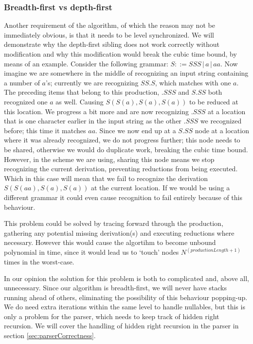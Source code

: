 \documentclass[a4paper,10pt]{article}
\begin{document}
\subsubsection{Breadth-first vs depth-first}
Another requirement of the algorithm, of which the reason may not be immediately obvious, is that it needs to be level synchronized. We will demonstrate why the depth-first sibling does not work correctly without modification and why this modification would break the cubic time bound, by means of an example. Consider the following grammar: $S ::= SSS\,|\,a\,|\,aa$. Now imagine we are somewhere in the middle of recognizing an input string containing a number of $a$'s; currently we are recognizing $SS.S$, which matches with one $a$. The preceding items that belong to this production, $.SSS$ and $S.SS$ both recognized one $a$ as well. Causing $S(S(a),S(a),S(a))$ to be reduced at this location. We progress a bit more and are now recognizing $.SSS$ at a location that is one character earlier in the input string as the other $.SSS$ we recognized before; this time it matches $aa$. Since we now end up at a $S.SS$ node at a location where it was already recognized, we do not progress further; this node needs to be shared, otherwise we would do duplicate work, breaking the cubic time bound. However, in the scheme we are using, sharing this node means we stop recognizing the current derivation, preventing reductions from being executed. Which in this case will mean that we fail to recognize the derivation $S(S(aa),S(a),S(a))$ at the current location. If we would be using a different grammar it could even cause recognition to fail entirely because of this behaviour.

This problem could be solved by tracing forward through the production, gathering any potential missing derivation(s) and executing reductions where necessary. However this would cause the algortihm to become unbound polynomial in time, since it would lead us to `touch' nodes $N^{(productionLength+1)}$ times in the worst-case.

In our opinion the solution for this problem is both to complicated and, above all, unnecessary. Since our algorithm is breadth-first, we will never have stacks running ahead of others, eliminating the possibility of this behaviour popping-up. We do need extra iterations within the same level to handle nullables, but this is only a problem for the parser, which needs to keep track of hidden right recursion. We will cover the handling of hidden right recursion in the parser in section \ref{sec:parserCorrectness}.
\end{document}

